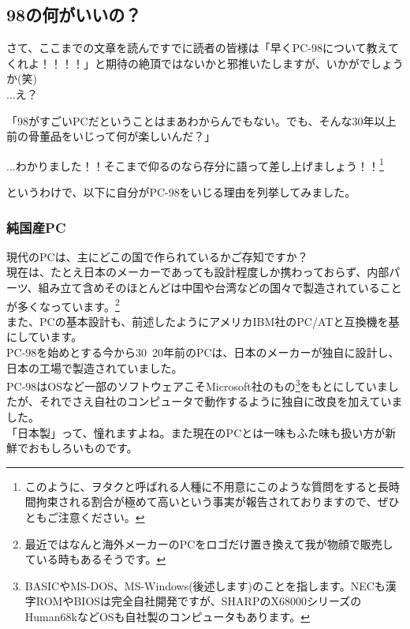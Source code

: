 \documentclass[b5paper,9pt,platex,dvipdfmx]{jsarticle}
\begin{document}
\begin{multicols}{3}
\part{98の何がいいの？}
\setcounter{section}{0}
さて、ここまでの文章を読んですでに読者の皆様は「早くPC-98について教えてくれよ！！！！」と期待の絶頂ではないかと邪推いたしますが、いかがでしょうか(笑)\\

...え？

\begin{screen}
「98がすごいPCだということはまあわからんでもない。でも、そんな30年以上前の骨董品をいじって何が楽しいんだ？」
\end{screen}

...わかりました！！そこまで仰るのなら存分に語って差し上げましょう！！\footnote{このように、ヲタクと呼ばれる人種に不用意にこのような質問をすると長時間拘束される割合が極めて高いという事実が報告されておりますので、ぜひともご注意ください。}

というわけで、以下に自分がPC-98をいじる理由を列挙してみました。\\
\section[short]{純国産PC}
現代のPCは、主にどこの国で作られているかご存知ですか？\\
現在は、たとえ日本のメーカーであっても設計程度しか携わっておらず、内部パーツ、組み立て含めそのほとんどは中国や台湾などの国々で製造されていることが多くなっています。\footnote{最近ではなんと海外メーカーのPCをロゴだけ置き換えて我が物顔で販売している時もあるそうです。}\\
また、PCの基本設計も、前述したようにアメリカIBM社のPC/ATと互換機を基にしています。\\
PC-98を始めとする今から30~20年前のPCは、日本のメーカーが独自に設計し、日本の工場で製造されていました。\\
PC-98はOSなど一部のソフトウェアこそMicrosoft社のもの\footnote{BASICやMS-DOS、MS-Windows(後述します)のことを指します。NECも漢字ROMやBIOSは完全自社開発ですが、SHARPのX68000シリーズのHuman68kなどOSも自社製のコンピュータもあります。}をもとにしていましたが、それでさえ自社のコンピュータで動作するように独自に改良を加えていました。\\
「日本製」って、憧れますよね。また現在のPCとは一味もふた味も扱い方が新鮮でおもしろいものです。\\

\end{multicols}
\end{document}
